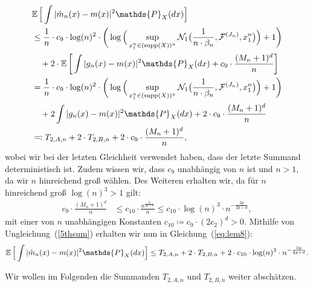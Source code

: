 \begin{equation}
\label{eq:lem8}
\begin{split}
& \E \Big[\int |\hat{m}_n(x) - m(x)|^2 \mathds{P}_X(dx)\Big] \\
& \leq \frac{1}{n} \cdot c_9 \cdot \log(n)^2 \cdot \bigg(\log\Big(\sup_{x_1^n \in (\supp(X))^n}\mathcal{N}_1\big(\frac{1}{n \cdot \beta_n},\mathcal{F}^{(J_n)},x_1^n\big)\Big) + 1\bigg) \\
& \quad + 2 \cdot \E\bigg[\int |g_{n}(x) - m(x)|^2 \mathds{P}_X(dx) + c_9 \cdot \frac{(M_n + 1)^d}{n}\bigg] \\
& = \frac{1}{n} \cdot c_9 \cdot \log(n)^2 \cdot \bigg(\log\Big(\sup_{x_1^n \in (\supp(X))^n}\mathcal{N}_1\big(\frac{1}{n \cdot \beta_n},\mathcal{F}^{(J_n)},x_1^n\big)\Big) + 1\bigg) \\
& \quad + 2 \int |g_{n}(x) - m(x)|^2 \mathds{P}_X(dx) + 2 \cdot c_9 \cdot \frac{(M_n + 1)^d}{n} \\
& \eqqcolon T_{2,A,n} + 2 \cdot T_{2,B,n} + 2 \cdot c_9 \cdot \frac{(M_n + 1)^d}{n},
\end{split}
\end{equation}
wobei wir bei der letzten Gleichheit verwendet haben, dass der letzte Summand deterministisch ist. Zudem wissen wir, dass $c_9$ unabhängig von $n$ ist und $n > 1$, da wir $n$ hinreichend groß wählen.
Des Weiteren erhalten wir, da für $n$ hinreichend groß $\log(n)^3 > 1$ gilt:
\begin{equation}
\label{5thsum}
\begin{split}
c_9 \cdot \frac{(M_n + 1)^d}{n} & \leq c_{10} \cdot \frac{n^{\frac{d}{2p + d}}}{n} \leq c_{10} \cdot \log(n)^3 \cdot n^{- \frac{2p}{2p + d}} ,
\end{split}
\end{equation} 
mit einer von $n$ unabhängigen Konstanten $c_{10} \coloneqq c_9 \cdot (2c_2)^d > 0$.
Mithilfe von Ungleichung~(\ref{5thsum}) erhalten wir nun in Gleichung~(\ref{eq:lem8}):
$$
\E \Big[\int |\hat{m}_n(x) - m(x)|^2 \mathds{P}_X(dx)\Big] \leq T_{2,A,n} + 2 \cdot T_{2,B,n} + 2 \cdot c_{10} \cdot \log(n)^3 \cdot n^{- \frac{2p}{2p + d}}.
$$

Wir wollen im Folgenden die Summanden $T_{2,A,n}$ und $T_{2,B,n}$ weiter abschätzen.


